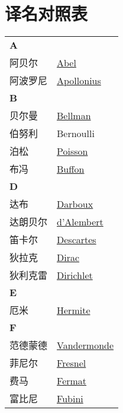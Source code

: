 \chapter{译名对照表}
\def\InsertTable#1{\begin{longtable}{ll} #1 \end{longtable}}%
\InsertTable{
    \textbf{A} \\
    阿贝尔 & \href{https://mathshistory.st-andrews.ac.uk/Biographies/Abel/}{Abel} \\
    阿波罗尼 & \href{https://mathshistory.st-andrews.ac.uk/Biographies/Apollonius/}{Apollonius} \\
    \textbf{B} \\
    贝尔曼 & \href{https://mathshistory.st-andrews.ac.uk/Biographies/Bellman/}{Bellman} \\
    伯努利 & Bernoulli \\
    泊松 & \href{https://mathshistory.st-andrews.ac.uk/Biographies/Poisson/}{Poisson} \\
    布冯 & \href{https://mathshistory.st-andrews.ac.uk/Biographies/Buffon/}{Buffon} \\
    \textbf{D} \\
    达布 & \href{https://mathshistory.st-andrews.ac.uk/Biographies/Darboux/}{Darboux} \\
    达朗贝尔 & \href{https://mathshistory.st-andrews.ac.uk/Biographies/DAlembert/}{d'Alembert} \\
    笛卡尔 & \href{https://mathshistory.st-andrews.ac.uk/Biographies/Descartes/}{Descartes} \\
    狄拉克 & \href{https://mathshistory.st-andrews.ac.uk/Biographies/Dirac/}{Dirac} \\
    狄利克雷 & \href{https://mathshistory.st-andrews.ac.uk/Biographies/Dirichlet/}{Dirichlet} \\
    \textbf{E} \\
    厄米 & \href{https://mathshistory.st-andrews.ac.uk/Biographies/Hermite/}{Hermite} \\
    \textbf{F} \\
    范德蒙德 & \href{https://mathshistory.st-andrews.ac.uk/Biographies/Vandermonde/}{Vandermonde} \\
    菲尼尔 & \href{https://mathshistory.st-andrews.ac.uk/Biographies/Fresnel/}{Fresnel} \\
    费马 & \href{https://mathshistory.st-andrews.ac.uk/Biographies/Fermat/}{Fermat} \\
    富比尼 & \href{https://mathshistory.st-andrews.ac.uk/Biographies/Fubini/}{Fubini} \\
}
